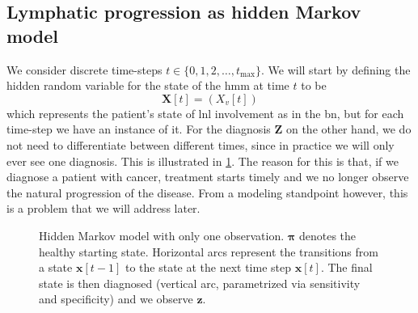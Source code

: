 \documentclass[\relativeRoot/main.tex]{subfiles}
\begin{document}
\subsection{Lymphatic progression as hidden Markov model}
\label{subsec:unilateral:spread_as_hmm}

We consider discrete time-steps $t \in \{ 0, 1, 2, \ldots, t_\text{max} \}$. We will start by defining the hidden random variable for the state of the \gls{hmm} at time $t$ to be
%
\begin{equation}
    \mathbf{X}[t] = \left( X_v[t] \right)
\end{equation}
%
which represents the patient's state of \gls{lnl} involvement as in the \gls{bn}, but for each time-step we have an instance of it. For the diagnosis $\mathbf{Z}$ on the other hand, we do not need to differentiate between different times, since in practice we will only ever see one diagnosis. This is illustrated in \cref{fig:unilateral:hmm_schema}. The reason for this is that, if we diagnose a patient with cancer, treatment starts timely and we no longer observe the natural progression of the disease. From a modeling standpoint however, this is a problem that we will address later.

\begin{figure}[h]
    \centering
    \def\svgwidth{0.65\textwidth}
    
    \caption{Hidden Markov model with only one observation. $\boldsymbol{\pi}$ denotes the healthy starting state. Horizontal arcs represent the transitions from a state $\mathbf{x}[t-1]$ to the state at the next time step $\mathbf{x}[t]$. The final state is then diagnosed (vertical arc, parametrized via sensitivity and specificity) and we observe $\mathbf{z}$.}
    \label{fig:unilateral:hmm_schema}
\end{figure}
\end{document}
